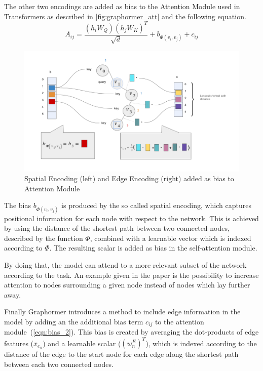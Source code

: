 The other two encodings are added as bias to the Attention Module used in Transformers as described in \autoref{fig:graphormer_att} and the following equation.
\begin{equation}
    A_{ij} = \frac{(h_i W_Q)(h_j W_K)^T}{\sqrt{d}} + b_{\Phi (v_i, v_j)} + c_{ij}
    \label{eqn:attention-matrix}
\end{equation}

\begin{figure}[ht!]
    \centering
    \includegraphics[scale=0.35]{tex/res/graphormer_attention.png}
    \caption{Spatial Encoding (left) and Edge Encoding (right) added as bias to Attention Module}
    \label{fig:graphormer_att}
\end{figure}

The bias $b_{\Phi (v_i, v_j)}$ is produced by the so called spatial encoding, which captures positional information for each node with respect to the network. This is achieved by using the distance of the shortest path between two connected nodes, described by the function $\Phi$, combined with a learnable vector which is indexed according to $\Phi$. The resulting scalar is added as bias in the self-attention module.

By doing that, the model can attend to a more relevant subset of the network according to the task. An example given in the paper is the possibility to increase attention to nodes surrounding a given node instead of nodes which lay further away.

Finally Graphormer introduces a method to include edge information in the model by adding an the additional bias term $c_{ij}$ to the attention module~(\autoref{eqn:bias_2}). This bias is created by averaging the dot-products of edge features ($x_{e_n}$) and a learnable scalar ($(w_n^E)^T$), which is indexed according to the distance of the edge to the start node for each edge along the shortest path between each two connected nodes.

